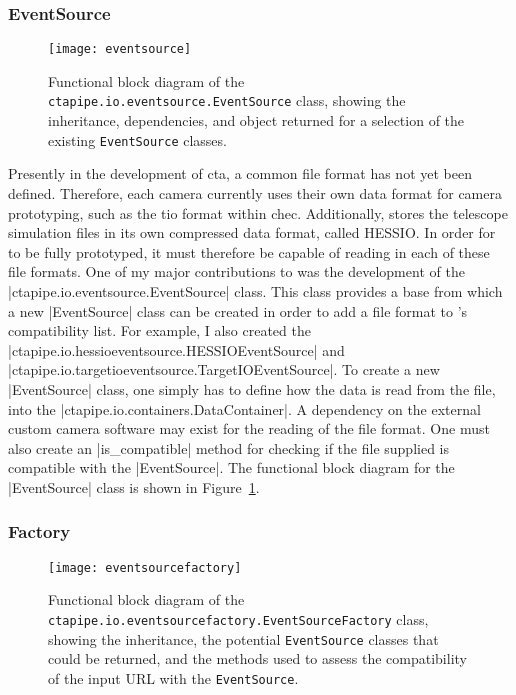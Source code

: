 \subsubsection{EventSource}

\begin{figure}[t]
  \centering
  \texttt{[image: eventsource]}
  \caption[Functional block diagram of the \lstinline{ctapipe.io.eventsource.EventSource} class.]{Functional block diagram of the \lstinline{ctapipe.io.eventsource.EventSource} class, showing the inheritance, dependencies, and object returned for a selection of the existing \lstinline{EventSource} classes.}
  \label{fig:eventsource}
\end{figure}

Presently in the development of \gls{cta}, a common file format has not yet been defined. Therefore, each camera currently uses their own data format for camera prototyping, such as the \gls{tio} format within \gls{chec}. Additionally,  stores the telescope simulation files in its own compressed data format, called HESSIO. In order for  to be fully prototyped, it must therefore be capable of reading in each of these file formats. One of my major contributions to  was the development of the |ctapipe.io.eventsource.EventSource| class. This class provides a base from which a new |EventSource| class can be created in order to add a file format to 's compatibility list. For example, I also created the |ctapipe.io.hessioeventsource.HESSIOEventSource| and |ctapipe.io.targetioeventsource.TargetIOEventSource|. To create a new |EventSource| class, one simply has to define how the data is read from the file, into the |ctapipe.io.containers.DataContainer|. A dependency on the external custom camera software may exist for the reading of the file format. One must also create an |is_compatible| method for checking if the file supplied is compatible with the |EventSource|. The functional block diagram for the |EventSource| class is shown in Figure~\ref{fig:eventsource}.

\subsubsection{Factory}

\begin{figure}[t]
  \centering
  \texttt{[image: eventsourcefactory]}
  \caption[Functional block diagram of the \lstinline{ctapipe.io.eventsourcefactory.EventSourceFactory} class.]{Functional block diagram of the \lstinline{ctapipe.io.eventsourcefactory.EventSourceFactory} class, showing the inheritance, the potential \lstinline{EventSource} classes that could be returned, and the methods used to assess the compatibility of the input URL with the \lstinline{EventSource}.}
  \label{fig:eventsourcefactory}
\end{figure}

